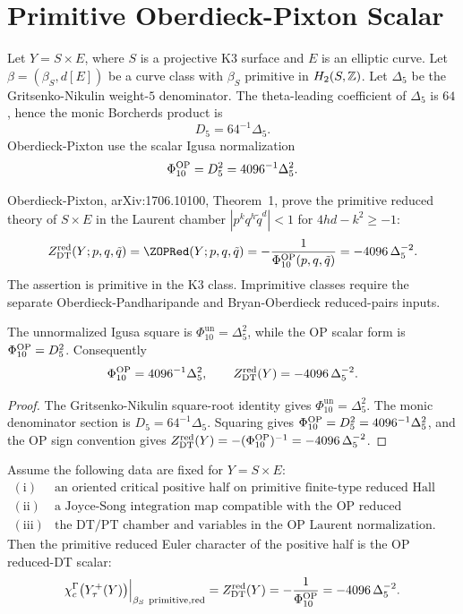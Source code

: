\section{Primitive Oberdieck-Pixton Scalar}
\label{sec:K3E-OP-primitive-character}

Let $Y=S\times E$, where $S$ is a projective K3 surface and $E$ is an
elliptic curve. Let $\beta=(\beta_S,d[E])$ be a curve class with
$\beta_S$ primitive in $H_2(S,\mathbb{Z})$. Let $\Delta_5$ be the
Gritsenko-Nikulin weight-$5$ denominator. The theta-leading coefficient
of $\Delta_5$ is $64$, hence the monic Borcherds product is
\[
  D_5=64^{-1}\Delta_5.
\]
Oberdieck-Pixton use the scalar Igusa normalization
\[
  \Phi_{10}^{\mathrm{OP}}=D_5^2=4096^{-1}\Delta_5^2.
\]

Oberdieck-Pixton, arXiv:1706.10100, Theorem~1, prove the primitive
reduced theory of $S\times E$ in the Laurent chamber
$|p^kq^h\tilde q^d|<1$ for $4hd-k^2\ge -1$:
\[
  \DTred(Y;p,q,\tilde q)
  =
  \ZOPRed(Y;p,q,\tilde q)
  =
  -\frac{1}{\PhiOP(p,q,\tilde q)}
  =
  -4096\,\Delta_5^{-2}.
\]
The assertion is primitive in the K3 class. Imprimitive classes require
the separate Oberdieck-Pandharipande and Bryan-Oberdieck reduced-pairs
inputs.

\begin{lemma}
\label{lem:D5-Phi10-normalization}
The unnormalized Igusa square is
$\Phi_{10}^{\mathrm{un}}=\Delta_5^2$, while the OP scalar form is
$\Phi_{10}^{\mathrm{OP}}=D_5^2$. Consequently
\[
  \Phi_{10}^{\mathrm{OP}}=4096^{-1}\Delta_5^2,
  \qquad
  Z^{\mathrm{red}}_{\mathrm{DT}}(Y)=-4096\,\Delta_5^{-2}.
\]
\end{lemma}

\begin{proof}
The Gritsenko-Nikulin square-root identity gives
$\Phi_{10}^{\mathrm{un}}=\Delta_5^2$. The monic denominator section is
$D_5=64^{-1}\Delta_5$. Squaring gives
$\Phi_{10}^{\mathrm{OP}}=D_5^2=4096^{-1}\Delta_5^2$, and the OP sign convention gives
$Z^{\mathrm{red}}_{\mathrm{DT}}(Y)=-(\Phi_{10}^{\mathrm{OP}})^{-1}=-4096\,\Delta_5^{-2}$.
\end{proof}

\begin{theorem}
\label{thm:Yplus-OP-match}
Assume the following data are fixed for \(Y=S\times E\):
\[
\begin{array}{ll}
\mathrm{(i)}&
\text{an oriented critical positive half on primitive finite-type
reduced Hall sectors,}\\
\mathrm{(ii)}&
\text{a Joyce-Song integration map compatible with the OP reduced
obstruction theory,}\\
\mathrm{(iii)}&
\text{the DT/PT chamber and variables in the OP Laurent normalization.}
\end{array}
\]
Then the primitive reduced Euler character of the positive half is the
OP reduced-DT scalar:
\[
  \chi_c^\Gamma\bigl(Y^{+}_\tau(Y)\bigr)
  \Big|_{\beta_S\ \mathrm{primitive,red}}
  =
  Z^{\mathrm{red}}_{\mathrm{DT}}(Y)
  =
  -\frac{1}{\Phi_{10}^{\mathrm{OP}}}
  =
  -4096\,\Delta_5^{-2}.
\]
\end{theorem}

